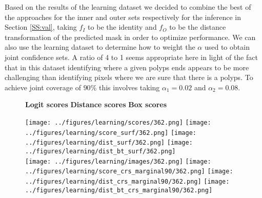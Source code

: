 Based on the results of the learning dataset we decided to combine the best of the approaches for the inner and outer sets respectively for the inference in Section \ref{SS:val}, taking $f_I$ to be the identity and $f_O$ to be the distance transformation of the predicted mask in order to optimize performance. We can also use the learning dataset to determine how to weight the $\alpha$ used to obtain joint confidence sets. A ratio of 4 to 1 seems appropriate here in light of the fact that in this dataset identifying where a given polyps ends appears to be more challenging than identifying pixels where we are sure that there is a polyps. To achieve joint coverage of $90\%$ this involves taking $\alpha_1 = 0.02$ and $\alpha_2 = 0.08$.
\begin{figure}[h!]
\hspace{4.3cm} {\fontsize{11pt}{13pt}\selectfont \textbf{Logit scores}} \hspace{0.8cm} 
{\fontsize{11pt}{13pt}\selectfont \textbf{Distance scores}} \hspace{1cm} 
{\fontsize{11pt}{13pt}\selectfont \textbf{Box scores}}
\begin{center}
	\texttt{[image: ../figures/learning/scores/362.png]}\hspace{0.3cm}
		\texttt{[image: ../figures/learning/score\_surf/362.png]}\hspace{0.3cm}	\texttt{[image: ../figures/learning/dist\_surf/362.png]}\hspace{0.3cm}
		\texttt{[image: ../figures/learning/dist\_bt\_surf/362.png]}\hspace{0.3cm}\\
		\texttt{[image: ../figures/learning/images/362.png]}\hspace{0.3cm}
	\texttt{[image: ../figures/learning/score\_crs\_marginal90/362.png]}\hspace{0.3cm}
	\texttt{[image: ../figures/learning/dist\_crs\_marginal90/362.png]}\hspace{0.3cm}
	\texttt{[image: ../figures/learning/dist\_bt\_crs\_marginal90/362.png]}\hspace{0.3cm}

\end{center}
\end{figure}
